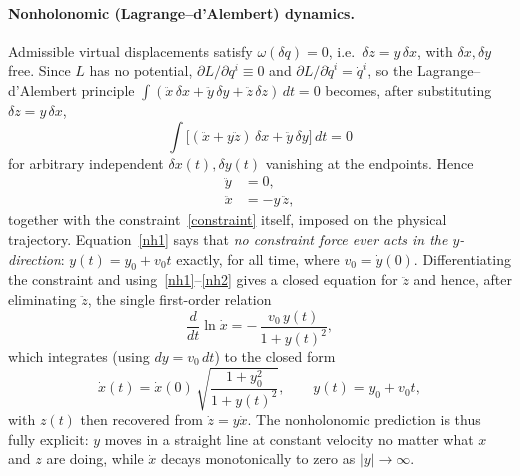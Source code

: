 \paragraph{Nonholonomic (Lagrange--d'Alembert) dynamics.}
Admissible virtual displacements satisfy $\omega(\delta q)=0$, i.e.\ $\delta z
= y\,\delta x$, with $\delta x,\delta y$ free. Since $L$ has no potential,
$\partial L/\partial q^i \equiv 0$ and $\partial L/\partial \dot q^i = \dot
q^i$, so the Lagrange--d'Alembert principle $\int (\ddot x\,\delta x+\ddot
y\,\delta y+\ddot z\,\delta z)\,dt = 0$ becomes, after substituting $\delta z =
y\,\delta x$,
\begin{equation}
\int \big[(\ddot x + y\ddot z)\,\delta x + \ddot y\,\delta y\big]\,dt = 0
\end{equation}
for arbitrary independent $\delta x(t),\delta y(t)$ vanishing at the endpoints.
Hence
\begin{align}
\ddot y &= 0, \label{nh1}\\
\ddot x &= -y\,\ddot z , \label{nh2}
\end{align}
together with the constraint~\eqref{constraint} itself, imposed on the physical
trajectory. Equation~\eqref{nh1} says that \emph{no constraint force ever acts
in the $y$-direction}: $y(t) = y_0 + v_0 t$ exactly, for all time, where $v_0 =
\dot y(0)$. Differentiating the constraint and using~\eqref{nh1}--\eqref{nh2}
gives a closed equation for $\ddot z$ and hence, after eliminating $\ddot z$,
the single first-order relation
\begin{equation}
\frac{d}{dt}\ln \dot x = -\,\frac{v_0\, y(t)}{1+y(t)^2},
\end{equation}
which integrates (using $dy = v_0\,dt$) to the closed form
\begin{equation}
\label{nh-solution}
\dot x(t) = \dot x(0)\,\sqrt{\frac{1+y_0^2}{1+y(t)^2}}, 
    \qquad y(t) = y_0 + v_0 t ,
\end{equation}
with $z(t)$ then recovered from $\dot z = y\dot x$. The nonholonomic prediction
is thus fully explicit: $y$ moves in a straight line at constant velocity no
matter what $x$ and $z$ are doing, while $\dot x$ decays monotonically to zero
as $|y|\to\infty$.

